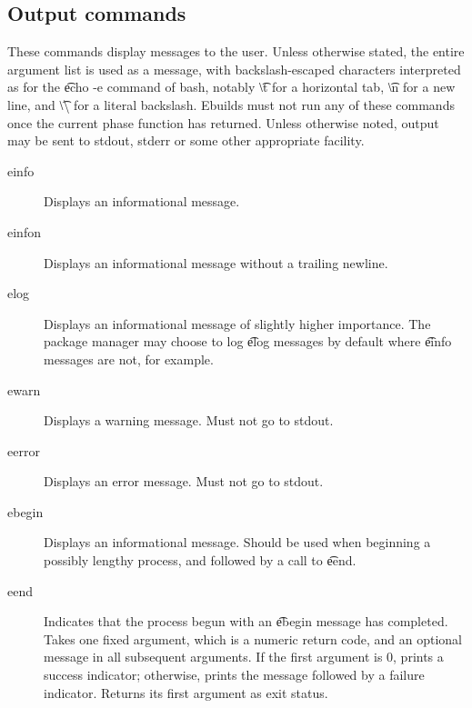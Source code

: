 \subsection{Output commands}
These commands display messages to the user. Unless otherwise stated, the entire argument list is
used as a message, with backslash-escaped characters interpreted as for the \t{echo -e} command of
bash, notably \t{\textbackslash t} for a horizontal tab, \t{\textbackslash n} for a new line, and
\t{\textbackslash\textbackslash} for a literal backslash. Ebuilds must not run any of these commands
once the current phase function has returned. Unless otherwise noted, output may be sent to stdout,
stderr or some other appropriate facility.
\begin{description}
\item[einfo] Displays an informational message.
\item[einfon] Displays an informational message without a trailing newline.
\item[elog] Displays an informational message of slightly higher importance. The package
    manager may choose to log \t{elog} messages by default where \t{einfo} messages are not, for
    example.
\item[ewarn] Displays a warning message. Must not go to stdout.
\item[eerror] Displays an error message. Must not go to stdout.
\item[ebegin] Displays an informational message. Should be used when beginning a possibly
    lengthy process, and followed by a call to \t{eend}.
\item[eend] Indicates that the process begun with an \t{ebegin} message has completed. Takes one
    fixed argument, which is a numeric return code, and an optional message in all subsequent
    arguments. If the first argument is 0, prints a success indicator; otherwise, prints the
    message followed by a failure indicator. Returns its first argument as exit status.
\end{description}

